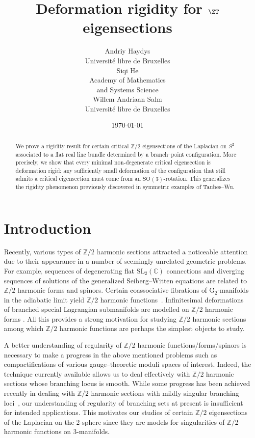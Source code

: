 \documentclass[11pt]{amsart}
\title[\normalsize Deformation rigidity for $\ZT$ eigensections]{\Large Deformation rigidity for $\ZT$ eigensections}
\author[\normalsize A. Haydys, S. He, A. Salm]
{
	\begin{minipage}{0.3\textwidth}
		\centering
		\normalsize Andriy Haydys \\
		{ Universit\'e libre de Bruxelles}
	\end{minipage}
	\begin{minipage}{0.36\textwidth}
		\centering
		\normalsize Siqi He\\
		{Academy of Mathematics \\and Systems Science}
	\end{minipage}
	\begin{minipage}{0.3\textwidth}
		\centering
		\normalsize Willem Andriaan Salm\\
		{Universit\'e libre de Bruxelles }
	\end{minipage}
}
\date{\today}
\newcommand{\Z}{{\mathbb Z}}
\let\MakeUppercase\relax %
\begin{document}
\begin{abstract}
	We prove a rigidity result for certain critical $\mathbb Z/2$ eigensections of the Laplacian on $S^2$ associated to a flat real line bundle determined by a branch–point configuration.  
	More precisely, we show that every minimal non-degenerate critical eigensection is deformation rigid: any sufficiently small deformation of the configuration that still admits a critical eigensection must come from an $\mathrm{SO}(3)$-rotation.  
	This generalizes the rigidity phenomenon previously discovered in symmetric examples of Taubes--Wu.  
\end{abstract} 


\begingroup
\def\uppercasenonmath#1{} %
\let\MakeUppercase\relax %
\maketitle
\endgroup

\section{Introduction}

Recently, various types of $\mathbb Z/2$ harmonic sections attracted a noticeable attention due to their appearance in a number of seemingly unrelated geometric problems. For example, sequences of degenerating flat $\mathrm{SL}_2(\mathbb C)$ connections and diverging sequences of solutions of the generalized Seiberg--Witten equations
\cite{haydyswalpuski2015compactness,taubes2013compactness,taubes2013psl2c,walpuskizhang2019compactness} are related to $\mathbb Z/2$ harmonic forms and spinors. Certain coassociative fibrations of $\mathrm G_2$-manifolds in the adiabatic limit yield $\mathbb Z/2$ harmonic functions~\cite{Donaldson17_AdiabaticLimits}. Infinitesimal deformations of branched special Lagrangian submanifolds are modelled on $\mathbb Z/2$ harmonic forms \cite{HE2023SpecialLagrangian}.
All this provides a strong motivation for studying $\mathbb Z/2$ harmonic sections among which $\mathbb Z/2$ harmonic functions are perhaps the simplest objects to study. 
    
A better understanding of regularity of $\mathbb Z/2$ harmonic functions/forms/spinors is necessary to make a progress in the above mentioned problems such as compactifications of various gauge--theoretic moduli spaces of interest. 
Indeed, the technique currently available allows us to deal effectively with $\Z/2$ harmonic sections whose branching locus is smooth. 
While some progress has been achieved recently in dealing with $\Z/2$ harmonic sections with mildly singular branching loci~\cite{HMT2023IndexGraphs}, our understanding of regularity of branching sets at present is insufficient for intended applications.  
This motivates our studies of certain $\mathbb Z/2$ eigensections of the Laplacian on the 2-sphere since they are models for singularities of $\mathbb Z/2$ harmonic functions on 3-manifolds. 
\end{document}
